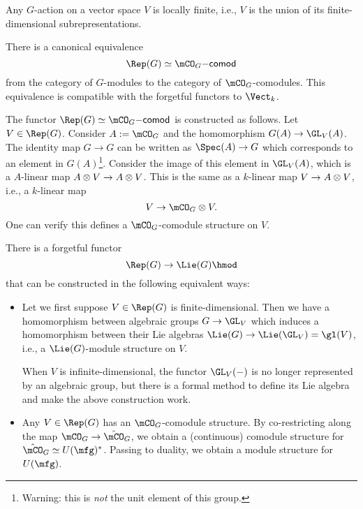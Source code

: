 \begin{prop}
	Any $G$-action on a vector space $V$ is locally finite, i.e., $V$ is the union of its finite-dimensional subrepresentations.
\end{prop}


\begin{prop}
	There is a canonical equivalence
	\[
		\Rep(G) \simeq \mCO_G\mathsf{-comod}
	\]
	from the category of $G$-modules to the category of $\mCO_G$-comodules. This equivalence is compatible with the forgetful functors to $\Vect_k$.
\end{prop}

\begin{rem}
	The functor $\Rep(G) \simeq \mCO_G\mathsf{-comod}$ is constructed as follows. Let $V\in \Rep(G)$. Consider $A:=\mCO_G$ and the homomorphism $G(A) \to \GL_V(A)$. The identity map $G\to G$ can be written as $\Spec(A) \to G$ which corresponds to an element in $G(A)$\footnote{Warning: this is \emph{not} the unit element of this group.}. Consider the image of this element in $\GL_V(A)$, which is a $A$-linear map $A\ot V\to A\ot V$. This is the same as a $k$-linear map $V\to A\ot V$, i.e., a $k$-linear map
	\[
		V\to \mCO_G \ot V.
	\]
	One can verify this defines a $\mCO_G$-comodule structure on $V$.
\end{rem}

\begin{constr}
	There is a forgetful functor
	\[
		\Rep(G) \to \Lie(G)\hmod
	\]
	that can be constructed in the following equivalent ways:

	\begin{itemize}
		\item 
			Let we first suppose $V\in \Rep(G)$ is finite-dimensional. Then we have a homomorphism between algebraic groups $G\to \GL_V$ which induces a homomorphism between their Lie algebras $\Lie(G) \to \Lie(\GL_V) =\gl(V)$, i.e., a $\Lie(G)$-module structure on $V$.

			When $V$ is infinite-dimensional, the functor $\GL_V(-)$ is no longer represented by an algebraic group, but there is a formal method to define its Lie algebra and make the above construction work.
		\item
			Any $V\in \Rep(G)$ has an $\mCO_G$-comodule structure. By co-restricting along the map $\mCO_G \to \hat\mCO_G$, we obtain a (continuous) comodule structure for $\hat\mCO_G\simeq U(\mfg)^*$. Passing to duality, we obtain a module structure for $U(\mfg)$.

	\end{itemize}
\end{constr}

